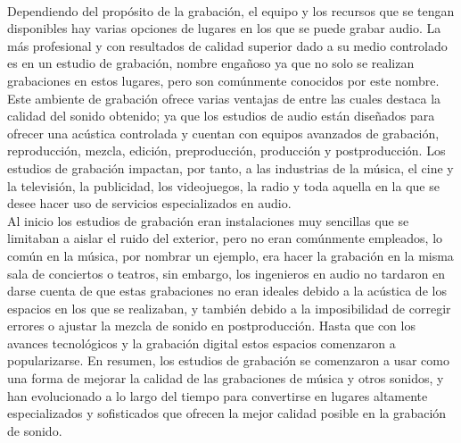 \\
Dependiendo del propósito de la grabación, el equipo y los recursos que se tengan disponibles hay varias opciones de lugares en los que se puede grabar audio. La más profesional y con resultados de calidad superior dado a su medio controlado es en un estudio de grabación, nombre engañoso ya que no solo se realizan grabaciones en estos lugares, pero son comúnmente conocidos por este nombre. Este ambiente de grabación ofrece varias ventajas de entre las cuales destaca la calidad del sonido obtenido; ya que los estudios de audio están diseñados para ofrecer una acústica controlada y cuentan con equipos avanzados de grabación, reproducción, mezcla, edición, preproducción, producción y postproducción. Los estudios de grabación impactan, por tanto, a las industrias de la música, el cine y la televisión, la publicidad, los videojuegos, la radio y toda aquella en la que se desee hacer uso de servicios especializados en audio.
\\
Al inicio los estudios de grabación eran instalaciones muy sencillas que se limitaban a aislar el ruido del exterior, pero no eran comúnmente empleados, lo común en la música, por nombrar un ejemplo, era hacer la grabación en la misma sala de conciertos o teatros, sin embargo, los ingenieros en audio no tardaron en darse cuenta de que estas grabaciones no eran ideales debido a la acústica de los espacios en los que se realizaban, y también debido a la imposibilidad de corregir errores o ajustar la mezcla de sonido en postproducción. Hasta que con los avances tecnológicos y la grabación digital estos espacios comenzaron a popularizarse. En resumen, los estudios de grabación se comenzaron a usar como una forma de mejorar la calidad de las grabaciones de música y otros sonidos, y han evolucionado a lo largo del tiempo para convertirse en lugares altamente especializados y sofisticados que ofrecen la mejor calidad posible en la grabación de sonido.